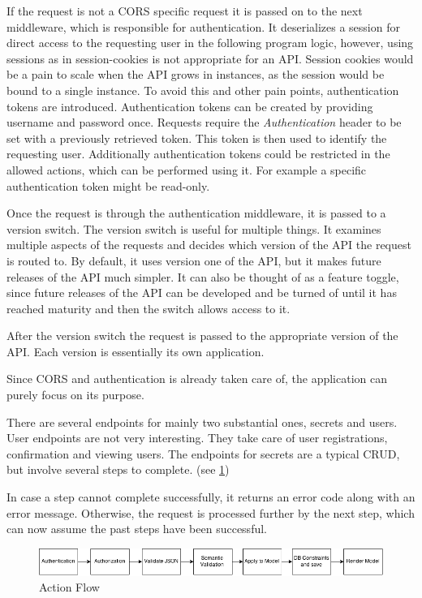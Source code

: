If the request is not a CORS specific request it is passed on to the next
middleware, which is responsible for authentication. It deserializes a session
for direct access to the requesting user in the following program logic,
however, using sessions as in session-cookies is not appropriate for an API.
Session cookies would be a pain to scale when the API grows in instances, as
the session would be bound to a single instance. To avoid this and other pain
points, authentication tokens are introduced. Authentication tokens can be
created by providing username and password once. Requests require the
\textit{Authentication} header to be set with a previously retrieved token.
This token is then used to identify the requesting user. Additionally
authentication tokens could be restricted in the allowed actions, which can be
performed using it. For example a specific authentication token might be
read-only.

Once the request is through the authentication middleware, it is passed to a
version switch. The version switch is useful for multiple things. It examines
multiple aspects of the requests and decides which version of the API the
request is routed to. By default, it uses version one of the API, but it makes
future releases of the API much simpler. It can also be thought of as a feature
toggle, since future releases of the API can be developed and be turned of
until it has reached maturity and then the switch allows access to it.

After the version switch the request is passed to the appropriate version of
the API. Each version is essentially its own application.

Since CORS and authentication is already taken care of, the application can
purely focus on its purpose.

There are several endpoints for mainly two substantial ones, secrets and users.
User endpoints are not very interesting. They take care of user registrations,
confirmation and viewing users. The endpoints for secrets are a typical CRUD,
but involve several steps to complete. (see \ref{fig:action_flow})

In case a step cannot complete successfully, it returns an error code along
with an error message. Otherwise, the request is processed further by the next
step, which can now assume the past steps have been successful.

\begin{figure}
  \includegraphics[scale=0.50]{pictures/action_flow.png}
  \caption{Action Flow}
  \centering
  \label{fig:action_flow}
\end{figure}

